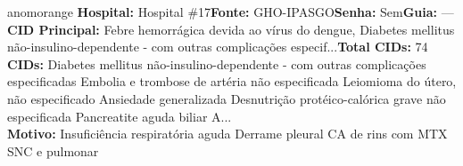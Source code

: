\documentclass[a4paper,10pt]{article}
\begin{document}
\begin{anomalycard}[Interna\c{c}\~{a}o \#117 | Pac. \#161 | ALTO (z=3.15) | LOS: 19d | 04/03/2026\,$\to$\,—]{anomorange}
\textbf{Hospital:} Hospital \#17\quad \textbf{Fonte:} GHO-IPASGO\quad \textbf{Senha:} Sem\quad \textbf{Guia:} ---\\

\textbf{CID Principal:} {\small Febre hemorrágica devida ao vírus do dengue, Diabetes mellitus não-insulino-dependente - com outras complicações especif...}\quad\textbf{Total CIDs:} 74\\

\textbf{CIDs:} {\scriptsize Diabetes mellitus não-insulino-dependente - com outras complicações especificadas \textbar{} Embolia e trombose de artéria não especificada \textbar{} Leiomioma do útero, não especificado \textbar{} Ansiedade generalizada \textbar{} Desnutrição protéico-calórica grave não especificada \textbar{} Pancreatite aguda biliar \textbar{} A...}\\

\textbf{Motivo:} {\scriptsize Insuficiência respiratória aguda  Derrame pleural  CA de rins com MTX SNC e pulmonar}\\




\end{anomalycard}
\end{document}
